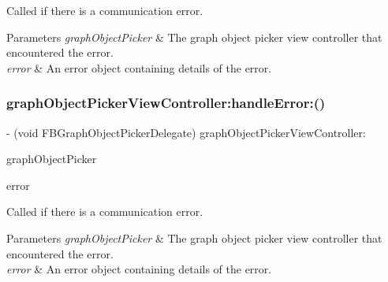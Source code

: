 Called if there is a communication error.


\begin{DoxyParams}{Parameters}
{\em graph\+Object\+Picker} & The graph object picker view controller that encountered the error. \\
\hline
{\em error} & An error object containing details of the error. \\
\hline
\end{DoxyParams}
\mbox{\label{protocolFBGraphObjectPickerDelegate_01-p_a99107978ecbc60a1a7daeeb2367d5cbf}} 
\subsubsection{\texorpdfstring{graph\+Object\+Picker\+View\+Controller\+:handle\+Error\+:()}{graphObjectPickerViewController:handleError:()}\hspace{0.1cm}{\footnotesize\ttfamily [3/5]}}
{\footnotesize\ttfamily -\/ (void F\+B\+Graph\+Object\+Picker\+Delegate) graph\+Object\+Picker\+View\+Controller\+: \begin{DoxyParamCaption}\item[{(\hyperlink{interfaceFBGraphObjectPickerViewController}{F\+B\+Graph\+Object\+Picker\+View\+Controller} $\ast$)}]{graph\+Object\+Picker }\item[{handleError:(N\+S\+Error $\ast$)}]{error }\end{DoxyParamCaption}\hspace{0.3cm}{\ttfamily [optional]}}

Called if there is a communication error.


\begin{DoxyParams}{Parameters}
{\em graph\+Object\+Picker} & The graph object picker view controller that encountered the error. \\
\hline
{\em error} & An error object containing details of the error. \\
\hline
\end{DoxyParams}
\mbox{\label{protocolFBGraphObjectPickerDelegate_01-p_a99107978ecbc60a1a7daeeb2367d5cbf}} 
